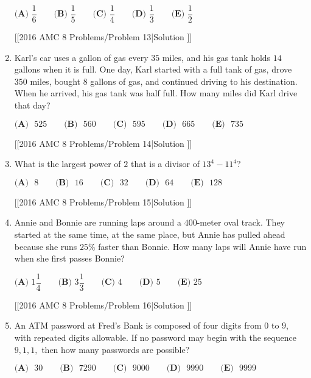 \documentclass{article}
\begin{document}
\begin{enumerate}[label=\arabic*., itemsep=0.5em]
\(\textbf{(A) }\dfrac{1}{6}\qquad\textbf{(B) }\dfrac{1}{5}\qquad\textbf{(C) }\dfrac{1}{4}\qquad\textbf{(D) }\dfrac{1}{3}\qquad \textbf{(E) }\dfrac{1}{2}\)

[[2016 AMC 8 Problems/Problem 13|Solution
]]\par \vspace{0.5em}\item Karl's car uses a gallon of gas every \(35\) miles, and his gas tank holds \(14\) gallons when it is full. One day, Karl started with a full tank of gas, 
drove \(350\) miles, bought \(8\) gallons of gas, and continued driving to his destination. When he arrived, his gas tank was half full. How many miles did Karl drive that day? 

\(\textbf{(A)}\mbox{ }525\qquad\textbf{(B)}\mbox{ }560\qquad\textbf{(C)}\mbox{ }595\qquad\textbf{(D)}\mbox{ }665\qquad\textbf{(E)}\mbox{ }735\)

[[2016 AMC 8 Problems/Problem 14|Solution
]]\par \vspace{0.5em}\item What is the largest power of \(2\) that is a divisor of \(13^4 - 11^4\)?

\(\textbf{(A)}\mbox{ }8\qquad \textbf{(B)}\mbox{ }16\qquad \textbf{(C)}\mbox{ }32\qquad \textbf{(D)}\mbox{ }64\qquad \textbf{(E)}\mbox{ }128\)

[[2016 AMC 8 Problems/Problem 15|Solution
]]\par \vspace{0.5em}\item Annie and Bonnie are running laps around a \(400\)-meter oval track. They started at the same time, at the same place, but Annie has pulled ahead because she runs \(25\%\) faster than Bonnie. How many laps will Annie have run when she first passes Bonnie?

\(\textbf{(A) }1\dfrac{1}{4}\qquad\textbf{(B) }3\dfrac{1}{3}\qquad\textbf{(C) }4\qquad\textbf{(D) }5\qquad \textbf{(E) }25\)

[[2016 AMC 8 Problems/Problem 16|Solution
]]\par \vspace{0.5em}\item An ATM password at Fred's Bank is composed of four digits from \(0\) to \(9\), with repeated digits allowable. If no password may begin with the sequence \(9,1,1,\) then how many passwords are possible?

\(\textbf{(A)}\mbox{ }30\qquad\textbf{(B)}\mbox{ }7290\qquad\textbf{(C)}\mbox{ }9000\qquad\textbf{(D)}\mbox{ }9990\qquad\textbf{(E)}\mbox{ }9999\)


\end{enumerate}
\end{document}
